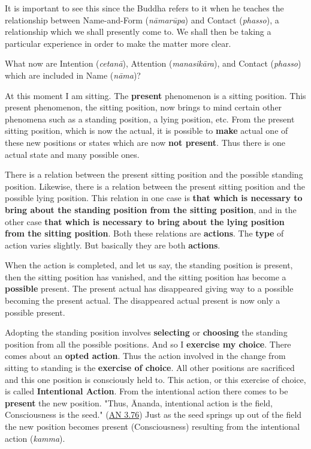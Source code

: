 It is important to see this since the Buddha refers to it when he
teaches the relationship between Name-and-Form (\emph{nāmarūpa}) and
Contact (\emph{phasso}), a relationship which we shall presently come to.
We shall then be taking a particular experience in order to make the
matter more clear.


What now are Intention (\emph{cetanā}), Attention (\emph{manasikāra}), and
Contact (\emph{phasso}) which are included in Name (\emph{nāma})?


At this moment I am sitting. The \textbf{present} phenomenon is a sitting
position. This present phenomenon, the sitting position, now brings to
mind certain other phenomena such as a standing position, a lying
position, etc. From the present sitting position, which is now the
actual, it is possible to \textbf{make} actual one of these new positions or
states which are now \textbf{not present}. Thus there is one actual state and
many possible ones.


There is a relation between the present sitting position and the
possible standing position. Likewise, there is a relation between the
present sitting position and the possible lying position. This relation
in one case is \textbf{that which is necessary to bring about the standing
position from the sitting position}, and in the other case \textbf{that which
is necessary to bring about the lying position from the sitting
position}. Both these relations are \textbf{actions}. The \textbf{type} of action
varies slightly. But basically they are both \textbf{actions}.


When the action is completed, and let us say, the standing position is
present, then the sitting position has vanished, and the sitting
position has become a \textbf{possible} present. The present actual has
disappeared giving way to a possible becoming the present actual. The
disappeared actual present is now only a possible present.


Adopting the standing position involves \textbf{selecting} or \textbf{choosing} the
standing position from all the possible positions. And so I \textbf{exercise
my choice}. There comes about an \textbf{opted action}. Thus the action
involved in the change from sitting to standing is the \textbf{exercise of
choice}. All other positions are sacrificed and this one position is
consciously held to. This action, or this exercise of choice, is called
\textbf{Intentional Action}. From the intentional action there comes to be
\textbf{present} the new position. "Thus, Ānanda, intentional action is the
field, Consciousness is the seed." (\href{https://suttacentral.net/an3.76/en/thanissaro}{AN 3.76}) Just as the seed springs up out of
the field the new position becomes present (Consciousness) resulting
from the intentional action (\emph{kamma}).


